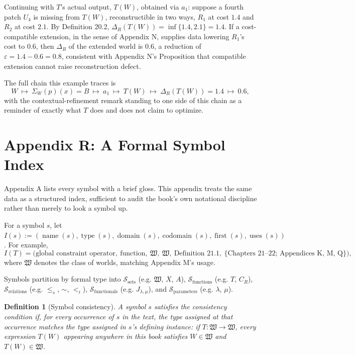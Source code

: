 \documentclass[11pt]{book}
\newtheorem*{appendixdefinition}{Definition}
\begin{document}
Continuing with $T$'s actual output, $T(W)$, obtained via $a_1$: suppose a fourth patch $U_4$ is missing from $T(W)$, reconstructible in two ways, $R_1$ at cost $1.4$ and $R_2$ at cost $2.1$. By Definition 20.2, $\Delta_R(T(W)) = \inf\{1.4, 2.1\} = 1.4$. If a cost-compatible extension, in the sense of Appendix N, supplies data lowering $R_1$'s cost to $0.6$, then $\Delta_R$ of the extended world is $0.6$, a reduction of $\varepsilon = 1.4 - 0.6 = 0.8$, consistent with Appendix N's Proposition that compatible extension cannot raise reconstruction defect.

The full chain this example traces is
\[
W \ \longmapsto\ \Sigma_W(p)(x) = B \ \longmapsto\ a_1 \ \longmapsto\ T(W) \ \longmapsto\ \Delta_R(T(W)) = 1.4 \ \longmapsto\ 0.6,
\]
with the contextual-refinement remark standing to one side of this chain as a reminder of exactly what $T$ does and does not claim to optimize.


\chapter*{Appendix R: A Formal Symbol Index}

Appendix A lists every symbol with a brief gloss. This appendix treats the same data as a structured index, sufficient to audit the book's own notational discipline rather than merely to look a symbol up.

For a symbol $s$, let $I(s) := (\operatorname{name}(s), \operatorname{type}(s), \operatorname{domain}(s), \operatorname{codomain}(s), \operatorname{first}(s), \operatorname{uses}(s))$. For example,
\[
I(T) = \big(\text{global constraint operator},\ \text{function},\ \mathfrak W,\ \mathfrak W,\ \text{Definition 21.1},\ \{\text{Chapters 21--22; Appendices K, M, Q}\}\big),
\]
where $\mathfrak W$ denotes the class of worlds, matching Appendix M's usage.

Symbols partition by formal type into $\mathcal S_{\mathrm{sets}}$ (e.g. $\mathfrak W$, $X$, $A$), $\mathcal S_{\mathrm{functions}}$ (e.g. $T$, $C_R$), $\mathcal S_{\mathrm{relations}}$ (e.g. $\leq_s$, $\sim$, $<_i$), $\mathcal S_{\mathrm{functionals}}$ (e.g. $J_{\lambda,\mu}$), and $\mathcal S_{\mathrm{parameters}}$ (e.g. $\lambda$, $\mu$).

\begin{appendixdefinition}[Symbol consistency]
A symbol $s$ satisfies the \emph{consistency condition} if, for every occurrence of $s$ in the text, the type assigned at that occurrence matches the type assigned in $s$'s defining instance: if $T : \mathfrak W \to \mathfrak W$, every expression $T(W)$ appearing anywhere in this book satisfies $W \in \mathfrak W$ and $T(W) \in \mathfrak W$.
\end{appendixdefinition}
\end{document}
